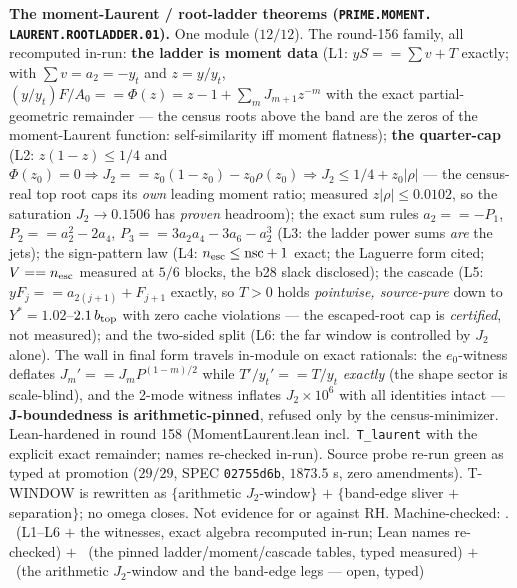 \documentclass[11pt,a4paper]{article}
\theoremstyle{definition}
\begin{document}
\par\smallskip\noindent\textbf{The moment-Laurent / root-ladder
theorems (\texttt{PRIME.\allowbreak MOMENT.\allowbreak
LAURENT.\allowbreak ROOTLADDER.01}).}
One module ($12/12$).  The round-156 family, all recomputed
in-run: \textbf{the ladder is moment data} (L1: $y S == \sum v +
T$ exactly; with $\sum v = a_2 = -y_t$ and $z = y/y_t$,
$(y/y_t)F/A_0 == \Phi(z) = z - 1 + \sum_m J_{m+1} z^{-m}$ with
the exact partial-geometric remainder --- the census roots above
the band are the zeros of the moment-Laurent function:
self-similarity iff moment flatness); \textbf{the quarter-cap}
(L2: $z(1-z) \le 1/4$ and $\Phi(z_0) = 0 \Rightarrow J_2 ==
z_0(1 - z_0) - z_0\rho(z_0) \Rightarrow J_2 \le 1/4 +
z_0|\rho|$ --- the census-real top root caps its \emph{own}
leading moment ratio; measured $z|\rho| \le 0.0102$, so the
saturation $J_2 \to 0.1506$ has \emph{proven} headroom); the
exact sum rules $a_2 == -P_1$, $P_2 == a_2^2 - 2a_4$, $P_3 ==
3a_2a_4 - 3a_6 - a_2^3$ (L3: the ladder power sums \emph{are}
the jets); the sign-pattern law (L4: $n_{\rm esc} \le
\mathrm{nsc} + 1$ exact; the Laguerre form cited; $V == n_{\rm
esc}$ measured at $5/6$ blocks, the b28 slack disclosed); the
cascade (L5: $y F_j == a_{2(j+1)} + F_{j+1}$ exactly, so $T > 0$
holds \emph{pointwise, source-pure} down to $Y^* =
1.02$--$2.1\,b_{\rm top}$ with zero cache violations --- the
escaped-root cap is \emph{certified}, not measured); and the
two-sided split (L6: the far window is controlled by $J_2$
alone).  The wall in final form travels in-module on exact
rationals: the $e_0$-witness deflates $J_m' == J_m
P^{(1-m)/2}$ while $T'/y_t' == T/y_t$ \emph{exactly} (the shape
sector is scale-blind), and the 2-mode witness inflates $J_2
\times 10^6$ with all identities intact ---
\textbf{J-boundedness is arithmetic-pinned}, refused only by the
census-minimizer.  Lean-hardened in round 158
(MomentLaurent.lean incl.\ \texttt{T\_laurent} with the explicit
exact remainder; names re-checked in-run).  Source probe re-run
green as typed at promotion ($29/29$, SPEC \texttt{02755d6b},
$1873.5$ s, zero amendments).  T-WINDOW is rewritten as
$\{$arithmetic $J_2$-window$\}$ $+$ $\{$band-edge sliver $+$
separation$\}$; no omega closes.  Not evidence for or against
RH.
Machine-checked: .
\mE\ (L1--L6 $+$ the witnesses, exact algebra recomputed in-run;
Lean names re-checked) $+$ \mC\ (the pinned ladder/moment/cascade
tables, typed measured) $+$ \mO\ (the arithmetic $J_2$-window
and the band-edge legs --- open, typed)
\par\smallskip
\end{document}
